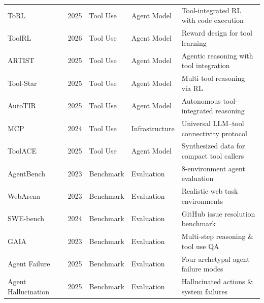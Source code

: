\begin{table}[htbp]
{\begin{tabular}{@{} l l l l l @{}}
ToRL~\cite{li2025torl} & 2025 & Tool Use & Agent Model & Tool-integrated RL with code execution \\
ToolRL~\cite{qian2026toolrl} & 2026 & Tool Use & Agent Model & Reward design for tool learning \\
ARTIST~\cite{singh2505agentic} & 2025 & Tool Use & Agent Model & Agentic reasoning with tool integration \\
Tool-Star~\cite{dong2505tool} & 2025 & Tool Use & Agent Model & Multi-tool reasoning via RL \\
AutoTIR~\cite{wei2025autotir} & 2025 & Tool Use & Agent Model & Autonomous tool-integrated reasoning \\
MCP~\cite{mcp2026tools} & 2024 & Tool Use & Infrastructure & Universal LLM--tool connectivity protocol \\
ToolACE~\cite{liu2025toolace} & 2025 & Tool Use & Agent Model & Synthesized data for compact tool callers \\
AgentBench~\cite{liu2023agentbench} & 2023 & Benchmark & Evaluation & 8-environment agent evaluation \\
WebArena~\cite{zhou2023webarena} & 2023 & Benchmark & Evaluation & Realistic web task environments \\
SWE-bench~\cite{jimenez2023swebench} & 2024 & Benchmark & Evaluation & GitHub issue resolution benchmark \\
GAIA~\cite{mialon2023gaia} & 2023 & Benchmark & Evaluation & Multi-step reasoning \& tool use QA \\
Agent Failure~\cite{roig2025llms} & 2025 & Benchmark & Evaluation & Four archetypal agent failure modes \\
Agent Hallucination~\cite{lin2025llm} & 2025 & Benchmark & Evaluation & Hallucinated actions \& system failures \\

\bottomrule
\end{tabular}
}
\end{table}
